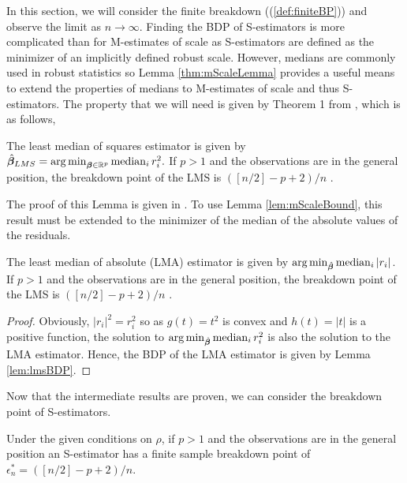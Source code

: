 In this section, we will consider the finite breakdown ((\ref{def:finiteBP})) and observe the limit as $n \xrightarrow{} \infty$. Finding the BDP of S-estimators is more complicated than for M-estimates of scale as S-estimators are defined as the minimizer of an implicitly defined robust scale. However, medians are commonly used in robust statistics so Lemma \ref{thm:mScaleLemma} provides a useful means to extend the properties of medians to M-estimates of scale and thus S-estimators. The property that we will need is given by Theorem 1 from \cite{rousseeuw1984least}, which is as follows,
\begin{lemma}
\label{lem:lmsBDP}
The least median of squares estimator is given by 
$\hat{\bm{\beta}}_{LMS} = \operatorname*{arg\,min}_{\bm{\beta} \in \mathbb{R}^p} \operatorname*{median}_i r_i^2.$ 
If $p>1$ and the observations are in the general position, the breakdown point of the LMS is $([n/2] - p + 2)/n$ \cite{rousseeuw1984least}.
\end{lemma}
\noindent The proof of this Lemma is given in \cite{rousseeuw1984least}. To use Lemma \ref{lem:mScaleBound}, this result must be extended to the minimizer of the median of the absolute values of the residuals.
\begin{lemma}
\label{lem:lmaBDP}
The least median of absolute (LMA) estimator is given by $\operatorname*{arg\,min}_{\hat{\bm{\beta}}} \operatorname*{median}_i |r_i|$. If $p>1$ and the observations are in the general position, the breakdown point of the LMS is $([n/2] - p + 2)/n$ \cite{rousseeuw1984least}.
\end{lemma}
\begin{proof}
Obviously, $|r_i|^2 = r_i^2$ so as $g(t) = t^2$ is convex and $h(t) = |t|$ is a positive function, the solution to $\operatorname*{arg\,min}_{\hat{\bm{\beta}}} \operatorname*{median}_i r_i^2$ is also the solution to the LMA estimator. Hence, the BDP of the LMA estimator is given by Lemma \ref{lem:lmsBDP}.
\end{proof}
\noindent Now that the intermediate results are proven, we can consider the breakdown point of S-estimators.
\begin{thm}
\label{thm:sBDP}
Under the given conditions on $\rho$, if $p>1$ and the observations are in the general position an S-estimator has a finite sample breakdown point of $\epsilon_n^* = ([n/2] - p + 2)/n$.
\end{thm}
